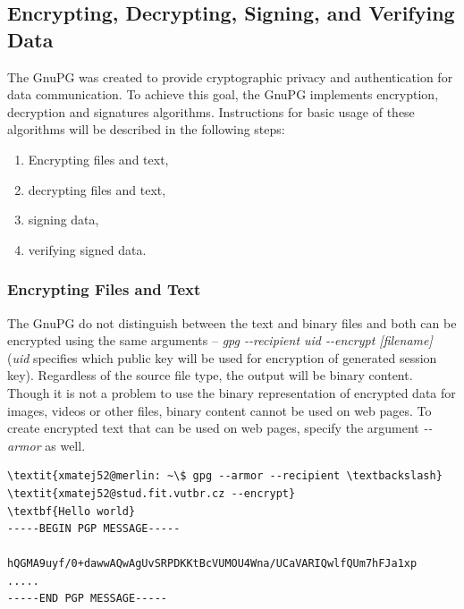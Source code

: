 \subsection{Encrypting, Decrypting, Signing, and Verifying Data}
The GnuPG was created to provide cryptographic privacy and authentication for data communication. To achieve this goal, the GnuPG implements encryption, decryption and signatures algorithms. Instructions for basic usage of these algorithms will be described in the following steps:
\begin{enumerate}
    \item Encrypting files and text,
    \item decrypting files and text,
    \item signing data,
    \item verifying signed data.
\end{enumerate}

\subsubsection*{Encrypting Files and Text}
The GnuPG do not distinguish between the text and binary files and both can be encrypted using the same arguments -- {\textit{gpg -{}-recipient uid -{}-encrypt [filename]}} (\textit{uid} specifies which public key will be used for encryption of generated session key). Regardless of the source file type, the output will be binary content. Though it is not a problem to use the binary representation of encrypted data for images, videos or other files, binary content cannot be used on web pages. To create encrypted text that can be used on web pages, specify the argument {\textit{-{}-armor}} as well.
\begin{Verbatim}[commandchars=\\\{\},codes={\catcode`$=3\catcode`_=8},samepage=false,frame=single]
\textit{xmatej52@merlin: ~\$ gpg --armor --recipient \textbackslash}
\textit{xmatej52@stud.fit.vutbr.cz --encrypt}
\textbf{Hello world}
-----BEGIN PGP MESSAGE-----

hQGMA9uyf/0+dawwAQwAgUvSRPDKKtBcVUMOU4Wna/UCaVARIQwlfQUm7hFJa1xp
.....
-----END PGP MESSAGE-----
\end{Verbatim}
